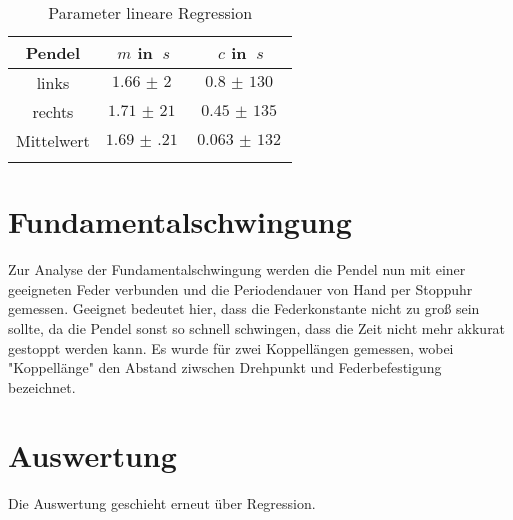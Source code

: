 \begin{table}[H]
    \begin{center}
        \caption{Parameter lineare Regression}
        \begin{tabular}{ccc}
            \hline
            Pendel             & $m$ in $\SI{}{s}$ & $c$ in $\SI{}{s}$ \\
            \hline
            links              & $\SI{1,66(2)}{}$ & $\SI{0,8(130)}{}$ \\
            rechts             & $\SI{1,71(21)}{}$ & $\SI{0,45(135)}{}$  \\
            \hline
            Mittelwert         & $\SI{1.69(21)}{}$ & $\SI{0,063(132)}{}$ \\
            \hline
            \label{tab:Schwingungen-einzeln-Regression}
        \end{tabular}
    \end{center}
\end{table}

\section{Fundamentalschwingung}

Zur Analyse der Fundamentalschwingung werden die Pendel nun mit einer geeigneten Feder verbunden und die Periodendauer von Hand per Stoppuhr gemessen.
Geeignet bedeutet hier, dass die Federkonstante nicht zu groß sein sollte, da die Pendel sonst so schnell schwingen, dass die Zeit nicht mehr akkurat gestoppt werden kann.
Es wurde für zwei Koppellängen gemessen, wobei "Koppellänge" den Abstand ziwschen Drehpunkt und Federbefestigung bezeichnet.

\section{Auswertung}

Die Auswertung geschieht erneut über Regression.

